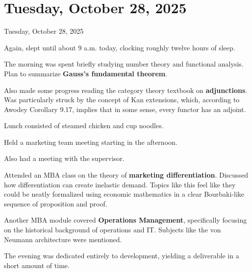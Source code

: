 \documentclass[dvipdfmx, autodetect-engine, aspectratio=169, 10.5pt]{beamer}
\begin{document}
\section{Tuesday, October 28, 2025}

\begin{frame}{Tuesday, October 28, 2025}

Again, slept until about 9 a.m. today, clocking roughly twelve hours of sleep.

The morning was spent briefly studying number theory and functional analysis. Plan to summarize \textbf{Gauss's fundamental theorem}.

Also made some progress reading the category theory textbook on \textbf{adjunctions}. Was particularly struck by the concept of Kan extensions, which, according to Awodey Corollary 9.17, implies that in some sense, every functor has an adjoint.

Lunch consisted of steamed chicken and cup noodles.

Held a marketing team meeting starting in the afternoon.

Also had a meeting with the supervisor.

Attended an MBA class on the theory of \textbf{marketing differentiation}. Discussed how differentiation can create inelastic demand. Topics like this feel like they could be neatly formalized using economic mathematics in a clear Bourbaki-like sequence of proposition and proof.

Another MBA module covered \textbf{Operations Management}, specifically focusing on the historical background of operations and IT. Subjects like the von Neumann architecture were mentioned.

The evening was dedicated entirely to development, yielding a deliverable in a short amount of time.
\end{frame}
\end{document}
